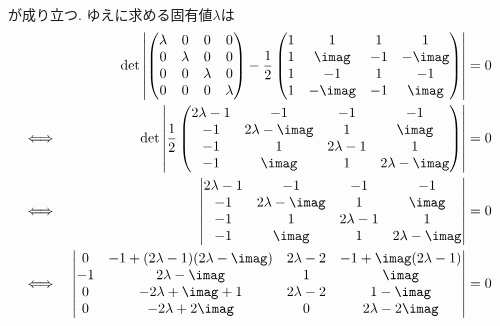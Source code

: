 \begin{enumerate}[(1)]
\begin{eqnarray*}
    \end{eqnarray*}
    が成り立つ. ゆえに求める固有値$\lambda$は
    \begin{eqnarray*}
        && \mathrm{det}\left\lvert
        \begin{pmatrix}
            \lambda & 0 & 0 & 0\\
            0 & \lambda & 0 & 0\\
            0 & 0 & \lambda & 0\\
            0 & 0 & 0 & \lambda 
        \end{pmatrix}
        -\frac{1}{2}
        \begin{pmatrix}
            1 & 1 & 1 & 1\\
            1 & \imag & -1 & -\imag\\
            1 & -1 & 1 & -1\\
            1 & -\imag & -1 & \imag
        \end{pmatrix}
        \right\rvert = 0\\
        \Longleftrightarrow\ && \mathrm{det}\left\lvert
        \frac{1}{2}
        \begin{pmatrix}
            2\lambda - 1 & -1 & -1 & -1\\
            -1 & 2\lambda - \imag & 1 & \imag\\
            -1 & 1 & 2\lambda - 1 & 1\\
            -1 & \imag & 1 & 2\lambda - \imag
        \end{pmatrix}\right\rvert = 0\\
        \Longleftrightarrow\ && 
        \begin{vmatrix}
            2\lambda - 1 & -1 & -1 & -1\\
            -1 & 2\lambda - \imag & 1 & \imag\\
            -1 & 1 & 2\lambda - 1 & 1\\
            -1 & \imag & 1 & 2\lambda - \imag
        \end{vmatrix} = 0\\
        \Longleftrightarrow\ && 
        \begin{vmatrix}
            0 & -1 + (2\lambda - 1)(2\lambda - \imag) & 2\lambda - 2 & -1 + \imag(2\lambda - 1)\\
            -1 & 2\lambda - \imag & 1 & \imag\\
            0 & -2\lambda + \imag + 1 & 2\lambda - 2 & 1 - \imag\\
            0 & -2\lambda + 2\imag & 0 & 2\lambda - 2\imag
        \end{vmatrix} = 0\\

\end{eqnarray*}
\end{enumerate}
